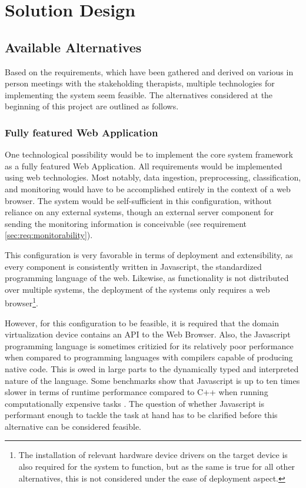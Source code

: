 \section{Solution Design}
\subsection{Available Alternatives}
Based on the requirements, which have been gathered and derived on various in person meetings with the stakeholding therapists, multiple technologies for implementing the system seem feasible. The alternatives considered at the beginning of this project are outlined as follows.

\subsubsection{Fully featured Web Application}
\label{sec:alt:fully-featured-web-app}
One technological possibility would be to implement the core system framework as a fully featured Web Application. All requirements would be implemented using web technologies. Most notably, data ingestion, preprocessing, classification, and monitoring would have to be accomplished entirely in the context of a web browser. The system would be self-sufficient in this configuration, without reliance on any external systems, though an external server component for sending the monitoring information is conceivable (see requirement \ref{sec:req:monitorability}).

This configuration is very favorable in terms of deployment and extensibility, as every component is consistently written in Javascript, the standardized programming language of the web. Likewise, as functionality is not distributed over multiple systems, the deployment of the systems only requires a web browser\footnote{The installation of relevant hardware device drivers on the target device is also required for the system to function, but as the same is true for all other alternatives, this is not considered under the ease of deployment aspect.}.

However, for this configuration to be feasible, it is required that the domain virtualization device contains an API to the Web Browser. Also, the Javascript programming language is sometimes critizied for its relatively poor performance when compared to programming languages with compilers capable of producing native code. This is owed in large parts to the dynamically typed and interpreted nature of the language. Some benchmarks show that Javascript is up to ten times slower in terms of runtime performance compared to C++ when running computationally expensive tasks \cite{BenchmarksGame}. The question of whether Javascript is performant enough to tackle the task at hand has to be clarified before this alternative can be considered feasible.
